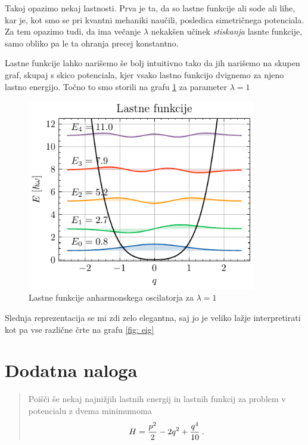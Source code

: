 \documentclass[slovene,11pt,a4paper]{article}
\begin{document}
Takoj opazimo nekaj lastnosti. Prva je ta, da so lastne funkcije ali sode ali lihe, kar je, kot smo se pri kvantni mehaniki naučili, posledica simetričnega potenciala. Za tem opazimo tudi, da ima večanje $\lambda$ nekakšen učinek \textit{stiskanja} lasnte funkcije, samo obliko pa le ta ohranja precej konstantno.

Lastne funkcije lahko narišemo še bolj intuitivno tako da jih narišemo na skupen graf, skupaj s skico potenciala, kjer vsako lastno funkcijo dvignemo za njeno lastno energijo. Točno to smo storili na grafu \ref{fig: pretty} za parameter $\lambda = 1$

\begin{figure}[ht]
\begin{center}
  \includegraphics[width=10cm]{graphs/pretty.pdf}
  \caption{Lastne funkcije anharmonskega oscilatorja za $\lambda = 1$}
  \label{fig: pretty}
\end{center}
\end{figure}

Slednja reprezentacija se mi zdi zelo elegantna, saj jo je veliko lažje interpretirati kot pa vse različne črte na grafu \ref{fig: eig}

\section{Dodatna naloga}

\begin{quote}
  Poišči še nekaj najnižjih lastnih energij
in lastnih funkcij za problem v potencialu z dvema minimumoma
\begin{equation*}
H = {p^2\over 2} - 2q^2 + {q^4\over 10} \>.
\end{equation*}
\end{quote}
\end{document}
